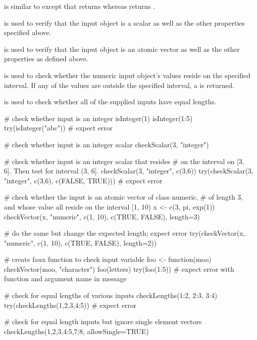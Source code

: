\begin{Details}\relax
{} is similar to  except that  returns  whereas  returns .

 is used to verify that the input object is a scalar as well as the other properties specified above. 

 is used to verify that the input object is an atomic vector as well as the other properties as defined above.

 is used to check whether the numeric input object's values reside on the specified interval. 
If any of the values are outside the specified interval, a  is returned.

 is used to check whether all of the supplied inputs have equal lengths.
\end{Details}
\begin{Examples}
\begin{ExampleCode}
# check whether input is an integer
isInteger(1)
isInteger(1:5)
try(isInteger("abc")) # expect error

# check whether input is an integer scalar
checkScalar(3, "integer")

# check whether input is an integer scalar that resides 
# on the interval on [3, 6]. Then test for interval (3, 6].
checkScalar(3, "integer", c(3,6))
try(checkScalar(3, "integer", c(3,6), c(FALSE, TRUE))) # expect error

# check whether the input is an atomic vector of class numeric,
# of length 3, and whose value all reside on the interval [1, 10)
x <- c(3, pi, exp(1))
checkVector(x, "numeric", c(1, 10), c(TRUE, FALSE), length=3)

# do the same but change the expected length; expect error
try(checkVector(x, "numeric", c(1, 10), c(TRUE, FALSE), length=2))

# create faux function to check input variable
foo <- function(moo) checkVector(moo, "character")
foo(letters)
try(foo(1:5)) # expect error with function and argument name in message

# check for equal lengths of various inputs
checkLengths(1:2, 2:3, 3:4)
try(checkLengths(1,2,3,4:5)) # expect error

# check for equal length inputs but ignore single element vectors
checkLengths(1,2,3,4:5,7:8, allowSingle=TRUE)

\end{ExampleCode}
\end{Examples}

